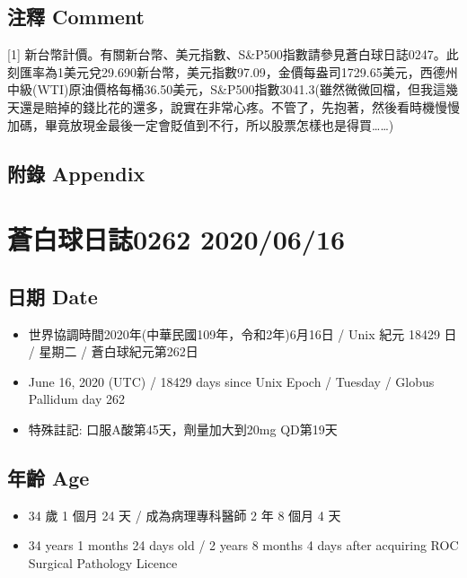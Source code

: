 \documentclass[a5paper, 11pt
]{book}
\providecommand{\tightlist}{%
  \setlength{\itemsep}{0pt}\setlength{\parskip}{0pt}}
\begin{document}
\hypertarget{ux6ce8ux91cb-comment-12}{%
\subsection{注釋 Comment}\label{ux6ce8ux91cb-comment-12}}

{[}1{]}
新台幣計價。有關新台幣、美元指數、S\&P500指數請參見蒼白球日誌0247。此刻匯率為1美元兌29.690新台幣，美元指數97.09，金價每盎司1729.65美元，西德州中級(WTI)原油價格每桶36.50美元，S\&P500指數3041.3(雖然微微回檔，但我這幾天還是賠掉的錢比花的還多，說實在非常心疼。不管了，先抱著，然後看時機慢慢加碼，畢竟放現金最後一定會貶值到不行，所以股票怎樣也是得買\ldots\ldots)

\hypertarget{ux9644ux9304-appendix-12}{%
\subsection{附錄 Appendix}\label{ux9644ux9304-appendix-12}}

\hypertarget{ux84bcux767dux7403ux65e5ux8a8c0262-20200616}{%
\section{蒼白球日誌0262
2020/06/16}\label{ux84bcux767dux7403ux65e5ux8a8c0262-20200616}}

\hypertarget{ux65e5ux671f-date-13}{%
\subsection{日期 Date}\label{ux65e5ux671f-date-13}}

\begin{itemize}
\tightlist
\item
  世界協調時間2020年(中華民國109年，令和2年)6月16日 / Unix 紀元 18429 日
  / 星期二 / 蒼白球紀元第262日
\item
  June 16, 2020 (UTC) / 18429 days since Unix Epoch / Tuesday / Globus
  Pallidum day 262
\item
  特殊註記: 口服A酸第45天，劑量加大到20mg QD第19天
\end{itemize}

\hypertarget{ux5e74ux9f61-age-13}{%
\subsection{年齡 Age}\label{ux5e74ux9f61-age-13}}

\begin{itemize}
\tightlist
\item
  34 歲 1 個月 24 天 / 成為病理專科醫師 2 年 8 個月 4 天
\item
  34 years 1 months 24 days old / 2 years 8 months 4 days after
  acquiring ROC Surgical Pathology Licence
\end{itemize}
\end{document}
